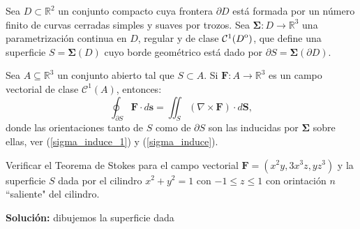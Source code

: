 \begin{theorem}
Sea $D \subset \mathbb{R}^2$ un conjunto compacto cuya frontera $\partial D$ está formada por un número finito de curvas cerradas simples y suaves por trozos. Sea $\boldsymbol{\Sigma}: D \to \mathbb{R}^3$ una parametrización continua en $D$, regular y de clase $\mathcal{C}^1({\kern0ptD}^{\mathrm{o}})$, que define una superficie $S = \boldsymbol{\Sigma}(D)$  cuyo borde geométrico está dado por $\partial S = \boldsymbol{\Sigma}(\partial D)$. 

Sea $A \subseteq \mathbb{R}^3$ un conjunto abierto tal que $S \subset A$. Si $\mathbf{F}: A \to \mathbb{R}^3$ es un campo vectorial de clase $\mathcal{C}^1(A)$, entonces:
\[
\oint_{\partial S}\mathbf{F}\cdot d\mathbf{s} = \iint_S (\nabla \times \mathbf{F})\cdot d\mathbf{S}, 
\]
donde las orientaciones tanto de $S$ como de $\partial S$ son las inducidas por $\boldsymbol{\Sigma}$ sobre ellas, ver (\ref{sigma_induce_1}) y (\ref{sigma_induce}).
\end{theorem}



\begin{example} Verificar el Teorema de Stokes para el campo vectorial $\mathbf{F} = (x^2y, 3x^3z, yz^3)$ y la superficie $S$ dada por el cilindro $x^2 + y^2 = 1$ con $-1 \le z \le 1$ con orintaci\'on $n$  ``saliente"  del cilindro. 
\end{example} \noindent\textbf{Solución:} dibujemos la superficie dada 




